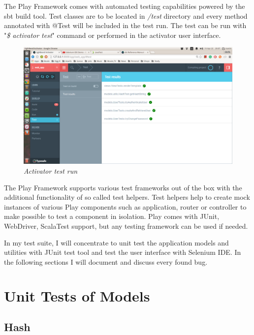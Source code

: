 \documentclass[12pt,twoside,a4paper]{report}
\begin{document}
The Play Framework comes with automated testing capabilities powered by the sbt build tool. Test classes are to be located in \emph{/test} directory and every method annotated with @Test will be included in the test run. The test can be run with "\emph{\$ activator test}" command or performed in the activator user interface.

\begin{figure}[!ht]
	\centering
		\includegraphics[width=1\textwidth, totalheight=9cm]
		{activator_test_run}
	\caption{\textit{Activator test run}}
	\label{f4.1.1}
\end{figure}

The Play Framework supports various test frameworks out of the box with the additional functionality of so called test helpers. Test helpers help to create mock instances of various Play components such as application, router or controller to make possible to test a component in isolation. Play comes with JUnit, WebDriver, ScalaTest support, but any testing framework can be used if needed.

In my test suite, I will concentrate to unit test the application models and utilities with JUnit test tool and test the user interface with Selenium IDE. In the following sections I will document and discuss every found bug.

\section{Unit Tests of Models}\label{5.2}

\subsection{Hash}\label{5.2.1}
\end{document}
